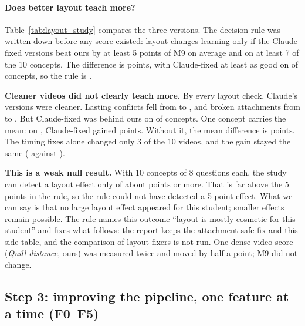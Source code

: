 \documentclass[11pt]{article}
\begin{document}
\paragraph{Does better layout teach more?} Table~\ref{tab:layout_study} compares the three versions. The decision
rule was written down before any score existed: layout changes learning only if the Claude-fixed versions beat ours by
at least 5 points of M9 on average and on at least 7 of the 10 concepts. The difference is \LSDiff{} points, with
Claude-fixed at least as good on \LSWins{} of \LSN{} concepts, so the rule is \textbf{\LSGate}.

\textbf{Cleaner videos did not clearly teach more.} By every layout check, Claude's versions were cleaner. Lasting
conflicts fell from \LSOursConflicts{} to \LSClaudeConflicts{}, and broken attachments from \LSOursAttach{} to
\LSClaudeAttach{}. But Claude-fixed was behind ours on \LSLosses{} of \LSN{} concepts. One concept carries the
mean: on \emph{\LSTopTopic}, Claude-fixed gained \LSTopDiff{} points. Without it, the mean difference is
\LSDiffWithoutTop{} points. The timing fixes alone changed only 3 of the 10 videos, and the gain stayed the same
(\LSAutoMNine{} against \LSOursMNine{}).

\textbf{This is a weak null result.} With 10 concepts of 8 questions each, the study can detect a layout effect only
of about \NMLayoutMDE{} points or more. That is far above the 5 points in the rule, so the rule could not have
detected a 5-point effect. What we can say is that no large layout effect appeared for this student; smaller effects
remain possible. The rule names this outcome ``layout is mostly cosmetic for this student'' and fixes what follows:
the report keeps the attachment-safe fix and this side table, and the comparison of layout fixers is not run. One dense-video score (\emph{Quill distance}, ours) was measured twice and moved by half a
point; M9 did not change.



\subsection{Step 3: improving the pipeline, one feature at a time (F0--F5)}

\end{document}
